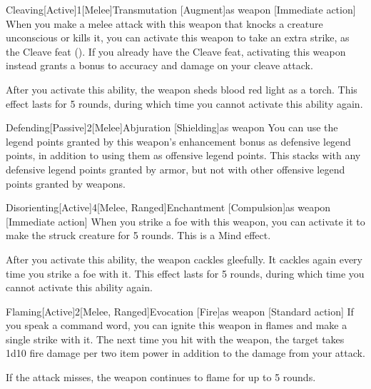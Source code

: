 \begin{magicitemdef}{Cleaving}[Active]{1}[Melee]{Transmutation [Augment]}{as weapon}
    [Immediate action] When you make a melee attack with this weapon that knocks a creature unconscious or kills it, you can activate this weapon to take an extra strike, as the Cleave feat ().
    If you already have the Cleave feat, activating this weapon instead grants a  bonus to accuracy and damage on your cleave attack.

    After you activate this ability, the weapon sheds blood red light as a torch.
    This effect lasts for 5 rounds, during which time you cannot activate this ability again.
\end{magicitemdef}

\begin{magicitemdef}{Defending}[Passive]{2}[Melee]{Abjuration [Shielding]}{as weapon}
     You can use the legend points granted by this weapon's enhancement bonus as defensive legend points, in addition to using them as offensive legend points.
    This stacks with any defensive legend points granted by armor, but not with other offensive legend points granted by weapons.
\end{magicitemdef}

\begin{magicitemdef}{Disorienting}[Active]{4}[Melee, Ranged]{Enchantment [Compulsion]}{as weapon}
    [Immediate action] When you strike a foe with this weapon, you can activate it to make the struck creature \disoriented for 5 rounds.
    This is a Mind effect.

    After you activate this ability, the weapon cackles gleefully.
    It cackles again every time you strike a foe with it.
    This effect lasts for 5 rounds, during which time you cannot activate this ability again.
\end{magicitemdef}

\begin{magicitemdef}{Flaming}[Active]{2}[Melee, Ranged]{Evocation [Fire]}{as weapon}
    [Standard action] If you speak a command word, you can ignite this weapon in flames and make a single strike with it. The next time you hit with the weapon, the target takes 1d10 fire damage per two item power in addition to the damage from your attack.

    If the attack misses, the weapon continues to flame for up to 5 rounds.
\end{magicitemdef}


